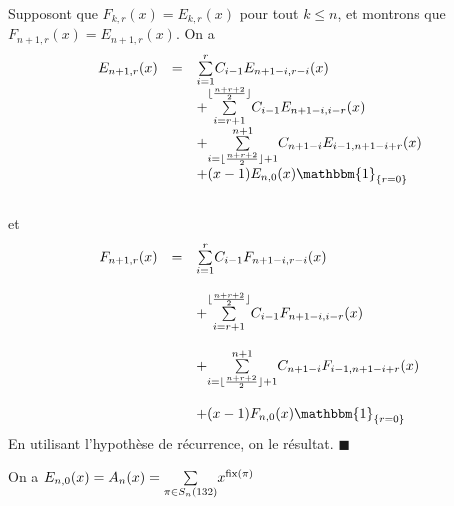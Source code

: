 Supposont que  $F_{k, r}(x)=E_{k, r}(x)$ pour tout $k\leq n$, et montrons que $F_{n+1, r}(x)=E_{n+1, r}(x)$. On a
\[
	\begin{array}{l l l}
		E_{n+1,r}(x) & =       & \underset{i=1}{\overset{r}{\sum}}C_{i-1}E_{n+1-i,r-i}(x)                                        \\
		             & \text{} & +\underset{i=r+1}{\overset{\lfloor \frac{n+r+2}{2}\rfloor}{\sum}}C_{i-1}E_{n+1-i,i-r}(x)        \\
		             & \text{} & +\underset{i=\lfloor \frac{n+r+2}{2}\rfloor +1}{\overset{n+1}{\sum}}C_{n+1-i}E_{i-1,n+1-i+r}(x) \\
		             & \text{} & +(x-1)E_{n,0}(x)\mathbbm{1}_{\{r=0\}}
	\end{array}
\]
\vspace{5pt}\\
et
\vspace{5pt}\\
\[
	\begin{array}{l l l}
		F_{n+1,r}(x) & =       & \underset{i=1}{\overset{r}{\sum}}C_{i-1}F_{n+1-i,r-i}(x)                                       \\ &\text{ }&\\
		             & \text{} & +\underset{i=r+1}{\overset{\lfloor \frac{n+r+2}{2}\rfloor}{\sum}}C_{i-1}F_{n+1-i,i-r}(x)       \\ &\text{ }&\\
		             & \text{} & +\underset{i=\lfloor \frac{n+r+2}{2}\rfloor+1}{\overset{n+1}{\sum}}C_{n+1-i}F_{i-1,n+1-i+r}(x) \\ &\text{ }&\\
		             & \text{} & +(x-1)F_{n,0}(x)\mathbbm{1}_{\{r=0\}}
	\end{array}
\]
En utilisant l'hypothèse de récurrence, on le résultat. $\blacksquare$


\begin{corollaire}
	On a $E_{n, 0}(x) = A_{n}(x) = \underset{\pi \in S_{n}(132)}{\sum} x^{\begin{rm}fix\end{rm}(\pi)}$\\
\end{corollaire}

